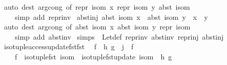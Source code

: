 \begin{isabellebody}
\ {\isacharparenleft}{\kern0pt}auto\ dest{\isacharcolon}{\kern0pt}\ arg{\isacharunderscore}{\kern0pt}cong\ {\isacharbrackleft}{\kern0pt}of\ {\isachardoublequoteopen}repr\ isom\ x{\isachardoublequoteclose}\ {\isachardoublequoteopen}repr\ isom\ y{\isachardoublequoteclose}\ {\isachardoublequoteopen}abst\ isom{\isachardoublequoteclose}{\isacharbrackright}{\kern0pt}\isanewline
\ \ \ \ simp\ add{\isacharcolon}{\kern0pt}\ repr{\isacharunderscore}{\kern0pt}inv{\isacharparenright}{\kern0pt}%
\endisatagproof
{\isafoldproof}%
%
\isadelimproof
\isanewline
%
\endisadelimproof
\isanewline
{}\isamarkupfalse%
\ abst{\isacharunderscore}{\kern0pt}inj{\isacharcolon}{\kern0pt}\ {\isachardoublequoteopen}abst\ isom\ x\ {\isacharequal}{\kern0pt}\ abst\ isom\ y\ {\isasymlongleftrightarrow}\ x\ {\isacharequal}{\kern0pt}\ y{\isachardoublequoteclose}\isanewline
%
\isadelimproof
\ \ %
\endisadelimproof
%
\isatagproof
{}\isamarkupfalse%
\ {\isacharparenleft}{\kern0pt}auto\ dest{\isacharcolon}{\kern0pt}\ arg{\isacharunderscore}{\kern0pt}cong\ {\isacharbrackleft}{\kern0pt}of\ {\isachardoublequoteopen}abst\ isom\ x{\isachardoublequoteclose}\ {\isachardoublequoteopen}abst\ isom\ y{\isachardoublequoteclose}\ {\isachardoublequoteopen}repr\ isom{\isachardoublequoteclose}{\isacharbrackright}{\kern0pt}\isanewline
\ \ \ \ simp\ add{\isacharcolon}{\kern0pt}\ abst{\isacharunderscore}{\kern0pt}inv{\isacharparenright}{\kern0pt}%
\endisatagproof
{\isafoldproof}%
%
\isadelimproof
\isanewline
%
\endisadelimproof
\isanewline
{}\isamarkupfalse%
\ simps\ {\isacharequal}{\kern0pt}\ Let{\isacharunderscore}{\kern0pt}def\ repr{\isacharunderscore}{\kern0pt}inv\ abst{\isacharunderscore}{\kern0pt}inv\ repr{\isacharunderscore}{\kern0pt}inj\ abst{\isacharunderscore}{\kern0pt}inj\isanewline
\isanewline
{}\isamarkupfalse%
\ iso{\isacharunderscore}{\kern0pt}tuple{\isacharunderscore}{\kern0pt}access{\isacharunderscore}{\kern0pt}update{\isacharunderscore}{\kern0pt}fst{\isacharunderscore}{\kern0pt}fst{\isacharcolon}{\kern0pt}\isanewline
\ \ {\isachardoublequoteopen}f\ {\isasymcirc}\ h\ g\ {\isacharequal}{\kern0pt}\ j\ {\isasymcirc}\ f\ {\isasymLongrightarrow}\isanewline
\ \ \ \ {\isacharparenleft}{\kern0pt}f\ {\isasymcirc}\ iso{\isacharunderscore}{\kern0pt}tuple{\isacharunderscore}{\kern0pt}fst\ isom{\isacharparenright}{\kern0pt}\ {\isasymcirc}\ {\isacharparenleft}{\kern0pt}iso{\isacharunderscore}{\kern0pt}tuple{\isacharunderscore}{\kern0pt}fst{\isacharunderscore}{\kern0pt}update\ isom\ {\isasymcirc}\ h{\isacharparenright}{\kern0pt}\ g\ {\isacharequal}{\kern0pt}\isanewline

\end{isabellebody}
